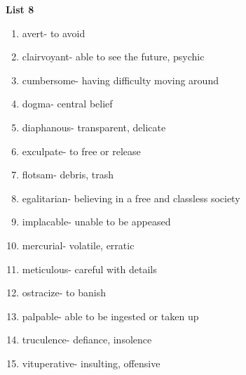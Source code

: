 \textbf{List 8}

\begin{enumerate}
\item avert- to avoid
\item clairvoyant- able to see the future, psychic 
\item cumbersome- having difficulty moving around
\item dogma- central belief 
\item diaphanous- transparent, delicate
\item exculpate- to free or release
\item flotsam- debris, trash
\item egalitarian- believing in a free and classless society
\item implacable- unable to be appeased
\item mercurial- volatile, erratic
\item meticulous- careful with details
\item ostracize- to banish
\item palpable- able to be ingested or taken up
\item truculence- defiance, insolence
\item vituperative- insulting, offensive
\end{enumerate}